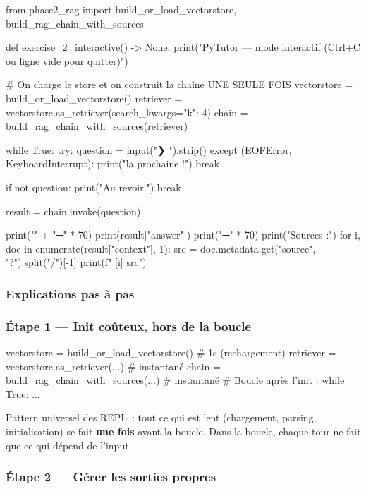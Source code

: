 \documentclass[11pt,a4paper]{article}
\begin{document}
\begin{pythoncode}
from phase2_rag import build_or_load_vectorstore, build_rag_chain_with_sources


def exercise_2_interactive() -> None:
    print("PyTutor — mode interactif (Ctrl+C ou ligne vide pour quitter)")

    # On charge le store et on construit la chaîne UNE SEULE FOIS
    vectorstore = build_or_load_vectorstore()
    retriever   = vectorstore.as_retriever(search_kwargs={"k": 4})
    chain       = build_rag_chain_with_sources(retriever)

    while True:
        try:
            question = input("\n❯ ").strip()
        except (EOFError, KeyboardInterrupt):
            print(" la prochaine !")
            break

        if not question:
            print("Au revoir.")
            break

        result = chain.invoke(question)

        print("\n" + "─" * 70)
        print(result["answer"])
        print("─" * 70)
        print("Sources :")
        for i, doc in enumerate(result["context"], 1):
            src = doc.metadata.get("source", "?").split("/")[-1]
            print(f"  [{i}] {src}")
\end{pythoncode}

\subsubsection{Explications pas à pas}

\subsubsection*{Étape 1 — Init coûteux, hors de la boucle}

\begin{pythoncode}
vectorstore = build_or_load_vectorstore()         # 1s (rechargement)
retriever   = vectorstore.as_retriever(...)       # instantané
chain       = build_rag_chain_with_sources(...)   # instantané
# Boucle après l'init :
while True:
    ...
\end{pythoncode}

Pattern universel des REPL~: tout ce qui est lent (chargement, parsing,
initialisation) se fait \textbf{une fois} avant la boucle. Dans la
boucle, chaque tour ne fait que ce qui dépend de l'input.

\subsubsection*{Étape 2 — Gérer les sorties propres}
\end{document}

